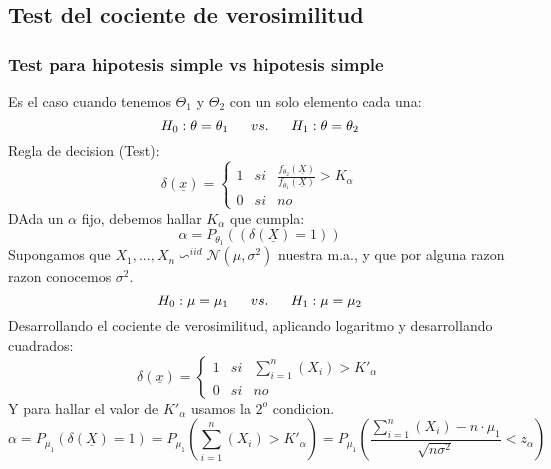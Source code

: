 \documentclass[titlepage,a4paper]{article}
\begin{document}
\subsection{Test del cociente de verosimilitud}
\subsubsection{Test para hipotesis simple vs hipotesis simple}
Es el caso cuando tenemos $\Theta_{1}$ y $\Theta_{2}$ con un solo elemento cada una:
\begin{equation*}
    H_{0}: \theta = \theta_{1} \hspace{16px} vs. \hspace{16px} H_{1}: \theta = \theta_{2}
\end{equation*}
Regla de decision (Test):
\begin{equation*}
    \delta(\underline{x})= \left\{ \begin{array}{lcc}
        1 &   si  & \frac{f_{\theta_{2}}(\underline{X})}{f_{\theta_{1}}(\underline{X})} > K_{\alpha} \\
        0 &  si & no
        \end{array}
    \right.
\end{equation*}
DAda un $\alpha$ fijo, debemos hallar $K_{\alpha}$ que cumpla:
\begin{equation*}
    \alpha = P_{\theta_{1}}((\delta(\underline{X}) = 1))
\end{equation*}
Supongamos que $X_{1},...,X_{n} \backsim^{iid} \mathcal{N}(\mu,\sigma^{2})$ nuestra m.a., y que por alguna razon razon conocemos $\sigma^{2}$.
\begin{equation*}
    H_{0}: \mu = \mu_{1} \hspace{16px} vs. \hspace{16px} H_{1}: \mu = \mu_{2}
\end{equation*}
Desarrollando el cociente de verosimilitud, aplicando logaritmo y desarrollando cuadrados:
\begin{equation*}
    \delta(\underline{x})= \left\{ \begin{array}{lcc}
        1 &   si  & \sum_{i=1}^{n}(X_{i}) > K'_{\alpha} \\
        0 &  si & no
        \end{array}
    \right.
\end{equation*}
Y para hallar el valor de $K'_{\alpha}$ usamos la $2^{o}$ condicion.
\begin{equation*}
    \alpha = P_{\mu_{1}}(\delta(\underline{X}) =1) = P_{\mu_{1}}(\sum_{i=1}^{n}(X_{i}) > K'_{\alpha}) = P_{\mu_{1}}(\frac{\sum_{i=1}^{n}(X_{i})-n \cdot \mu_{1}}{\sqrt{n\sigma^{2}}}< z _{\alpha})
\end{equation*}
\end{document}

